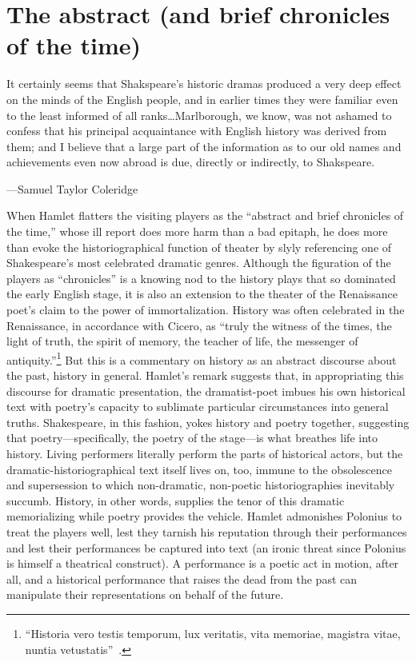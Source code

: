 \chapter{The abstract (and brief chronicles of the time)\label{ch:Methodology}}
\begin{bq}
It certainly seems that Shakspeare's historic dramas produced a very deep effect on the minds of the English people, and in earlier times they were familiar even to the least informed of all ranks\dots Marlborough, we know, was not ashamed to confess that his principal acquaintance with English history was derived from them; and I believe that a large part of the information as to our old names and achievements even now abroad is due, directly or indirectly, to Shakspeare.\nocite{coleridge_literary_1836}
\begin{flushright}
---Samuel Taylor Coleridge
\end{flushright}
\end{bq}
When Hamlet flatters the visiting players as the ``abstract and brief chronicles of the time,'' whose ill report does more harm than a bad epitaph, he does more than evoke the historiographical function of theater by slyly referencing one of Shakespeare’s most celebrated dramatic genres. Although the figuration of the players as ``chronicles'' is a knowing nod to the history plays that so dominated the early English stage, it is also an extension to the theater of the Renaissance poet’s claim to the power of immortalization. History was often celebrated in the Renaissance, in accordance with Cicero, as ``truly the witness of the times, the light of truth, the spirit of memory, the teacher of life, the messenger of antiquity.''\footnote{``Historia vero testis temporum, lux veritatis, vita memoriae, magistra vitae, nuntia vetustatis''~\cite[2.36]{cicero_oratore_1979}.} But this is a commentary on history as an abstract discourse about the past, history in general. Hamlet’s remark suggests that, in appropriating this discourse for dramatic presentation, the dramatist-poet imbues his own historical text with poetry's capacity to sublimate particular circumstances into general truths. Shakespeare, in this fashion, yokes history and poetry together, suggesting that poetry---specifically, the poetry of the stage---is what breathes life into history. Living performers literally perform the parts of historical actors, but the dramatic-historiographical text itself lives on, too, immune to the obsolescence and supersession to which non-dramatic, non-poetic historiographies inevitably succumb. History, in other words, supplies the tenor of this dramatic memorializing while poetry provides the vehicle. Hamlet admonishes Polonius to treat the players well, lest they tarnish his reputation through their performances and lest their performances be captured into text (an ironic threat since Polonius is himself a theatrical construct). A performance is a poetic act in motion, after all, and a historical performance that raises the dead from the past can manipulate their representations on behalf of the future.

